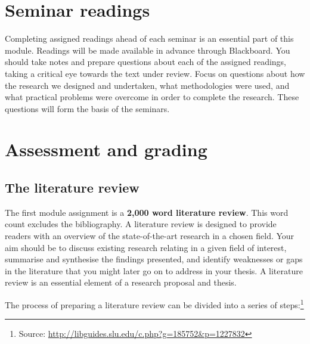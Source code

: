 \documentclass[a4paper,12pt]{article}
\begin{document}
\section*{Seminar readings}

	Completing assigned readings ahead of each seminar is an essential part of this module. Readings will be made available in advance through Blackboard. You should take notes and prepare questions about each of the assigned readings, taking a critical eye towards the text under review. Focus on questions about how the research we designed and undertaken, what methodologies were used, and what practical problems were overcome in order to complete the research. These questions will form the basis of the seminars.	
	
	
\section*{Assessment and grading}

\subsection*{The literature review}

	The first module assignment is a \textbf{2,000 word literature review}. This word count excludes the bibliography. A literature review is designed to provide readers with an overview of the state-of-the-art research in a chosen field. Your aim should be to discuss existing research relating in a given field of interest, summarise and synthesise the findings presented, and identify weaknesses or gaps in the literature that you might later go on to address in your thesis. A literature review is an essential element of a research proposal and thesis. 
	
	The process of preparing a literature review can be divided into a series of steps:\footnote{Source: \url{http://libguides.slu.edu/c.php?g=185752&p=1227832}}
\end{document}
